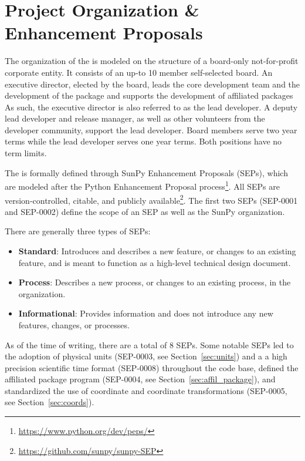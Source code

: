 \section{Project Organization \& Enhancement Proposals}
\label{sec:proj_org}

The organization of the \sunpyproj is modeled on the structure of a board-only not-for-profit corporate entity.
It consists of an up-to 10 member self-selected board.
An executive director, elected by the board, leads the core development team and the development of the \sunpypkg  package and supports the development of affiliated packages
As such, the executive director is also referred to as the lead developer.
A deputy lead developer and release manager, as well as other volunteers from the developer community, support the lead developer.
Board members serve two year terms while the lead developer serves one year terms. Both positions have no term limits.

The \sunpyproj is formally defined through SunPy Enhancement Proposals (SEPs), which are modeled after the Python Enhancement Proposal process\footnote{\url{https://www.python.org/dev/peps/}}.
All SEPs are version-controlled, citable, and publicly available\footnote{\url{https://github.com/sunpy/sunpy-SEP}}.
The first two SEPs (SEP-0001 and SEP-0002) define the scope of an SEP as well as the SunPy organization.

There are generally three types of SEPs:
\begin{itemize}
    \item \textbf{Standard}: Introduces and describes a new feature, or changes to an existing feature, and is meant to function as a high-level technical design document.
    \item \textbf{Process}: Describes a new process, or changes to an existing process, in the organization.
    \item \textbf{Informational}: Provides information and does not introduce any new features, changes, or processes.
\end{itemize}

As of the time of writing, there are a total of 8 SEPs.
Some notable SEPs led to the adoption of physical units (SEP-0003, see Section~\ref{sec:units}) and a a high precision scientific time format (SEP-0008) throughout the code base, defined the affiliated package program (SEP-0004, see Section~\ref{sec:affil_package}), and standardized the use of coordinate and coordinate transformations (SEP-0005, see Section~\ref{sec:coords}).
